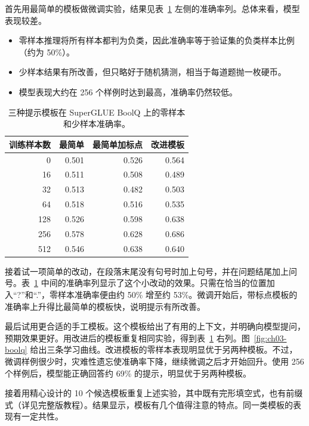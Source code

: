 首先用最简单的模板做微调实验，结果见表~\ref{tab:ch03-boolq} 左侧的准确率列。总体来看，模型表现较差。

\begin{itemize}
\item 零样本推理将所有样本都判为负类，因此准确率等于验证集的负类样本比例（约为 50\%）。
\item 少样本结果有所改善，但只略好于随机猜测，相当于每道题抛一枚硬币。
\item 模型表现大约在 256 个样例时达到最高，准确率仍然较低。
\end{itemize}

\begin{table}[!htbp]
\centering
\caption{三种提示模板在 SuperGLUE BoolQ 上的零样本和少样本准确率。}
\label{tab:ch03-boolq}
\begin{tabular}{@{}rrrr@{}}
\toprule
训练样本数 & 最简单 & 最简单加标点 & 改进模板\\
\midrule
0 & 0.501 & 0.526 & 0.564\\
16 & 0.511 & 0.508 & 0.489\\
32 & 0.513 & 0.482 & 0.503\\
64 & 0.518 & 0.516 & 0.535\\
128 & 0.526 & 0.598 & 0.638\\
256 & 0.578 & 0.628 & 0.686\\
512 & 0.546 & 0.638 & 0.640\\
\bottomrule
\end{tabular}
\end{table}

接着试一项简单的改动，在段落末尾没有句号时加上句号，并在问题结尾加上问号。表~\ref{tab:ch03-boolq} 中间的准确率列显示了这个小改动的效果。只需在恰当的位置加入“?”和“.”，零样本准确率便由约 50\% 增至约 53\%。微调开始后，带标点模板的准确率上升得比最简单的模板快，说明提示有所改善。

最后试用更合适的手工模板。这个模板给出了有用的上下文，并明确向模型提问，预期效果更好。用改进后的模板重复相同实验，得到表~\ref{tab:ch03-boolq} 右列。图~\ref{fig:ch03-boolq} 给出三条学习曲线。改进模板的零样本表现明显优于另两种模板。不过，微调样例很少时，灾难性遗忘使准确率下降，继续微调之后才开始回升。使用 256 个样例后，模型能正确回答约 69\% 的提示，明显优于另两种模板。


接着用精心设计的 10 个候选模板重复上述实验，其中既有完形填空式，也有前缀式（详见完整版教程）。结果显示，模板有几个值得注意的特点。同一类模板的表现有一定共性。

